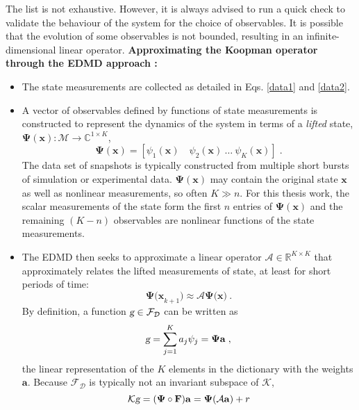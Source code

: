 The list is not exhaustive. However, it is always advised to run a quick check to validate the behaviour of the system for the choice of observables. It is possible that the evolution of some observables is not bounded, resulting in an infinite-dimensional linear operator. 
\newpage
\textbf{Approximating the Koopman operator through the EDMD approach \cite{WILLIAMS2016704}:} 
\begin{itemize}
    \item The state measurements are collected as detailed in Eqs. \ref{data1} and \ref{data2}.
    \item A vector of observables defined by functions of state measurements is constructed to represent the dynamics of the system in terms of a  \textit{lifted} state, $\mathbf{\Psi(x)}:\mathcal{M} \rightarrow \mathbb{C}^{1 \times K}$,
    \begin{equation}
    \label{Eq: DataMatrix}
        \mathbf{\Psi(x)} = [\psi_1(\mathbf{x}) \quad \psi_2(\mathbf{x}) ~ \dots ~ \psi_{K}(\mathbf{x})] \;.
    \end{equation}
    The data set of snapshots is typically constructed from multiple short bursts of simulation or experimental data. $\mathbf{\Psi(\mathbf{x})}$ may contain the original state $\mathbf{x}$ as well as nonlinear measurements, so often $K\gg n$. For this thesis work, the scalar measurements of the state form the first $n$ entries of $\mathbf{\Psi(x)}$ and the remaining $(K-n)$ observables are nonlinear functions of the state measurements. 
    \item The EDMD then seeks to approximate a linear operator $\mathbf{\mathcal{A}} \in \mathbb{R}^{K\times K}$ that approximately relates the lifted measurements of state, at least for short periods of time:
    \begin{equation}
        \mathbf{\Psi(x}_{k+1}) \approx \mathbf{\mathcal{A}\Psi(x}) \:.
    \end{equation}
    By definition, a function $\textsl{g} \in \mathcal{F_D}$ can be written as
    \begin{equation}
        \textsl{g} = \sum_{j=1}^K a_j\psi_j = \mathbf{\Psi a} \;,
    \end{equation}
    the linear representation of the $K$ elements in the dictionary with the weights $\mathbf{a}.$ Because $\mathcal{F_D}$ is typically not an invariant subspace of $\mathcal{K}$,
    \begin{equation}
        \mathcal{K}\textsl{g} = (\mathbf{\Psi} \circ \mathbf{F})\mathbf{a} = \mathbf{\Psi(\mathcal{A}a)} + r

\end{equation}
\end{itemize}
